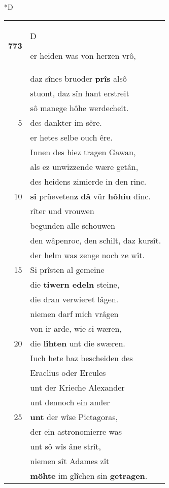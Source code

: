 \documentclass[8pt,a4paper,notitlepage]{article}
\begin{document}
\begin{table}[ht]
\begin{minipage}[t]{0.5\linewidth}
\small
\begin{center}*D
\end{center}
\begin{tabular}{rl}
\textbf{773} & \begin{large}D\end{large}er heiden was von herzen vrô,\\ 
 & daz sînes bruoder \textbf{prîs} alsô\\ 
 & stuont, daz sîn hant erstreit\\ 
 & sô manege hôhe werdecheit.\\ 
5 & des dankter im sêre.\\ 
 & er hetes selbe ouch êre.\\ 
 & Innen des hiez tragen Gawan,\\ 
 & als ez unwizzende wære getân,\\ 
 & des heidens zimierde in den rinc.\\ 
10 & \textbf{si} prüeveten\textbf{z} \textbf{dâ} vür \textbf{hôhiu} dinc.\\ 
 & rîter und vrouwen\\ 
 & begunden alle schouwen\\ 
 & den wâpenroc, den schilt, daz kursît.\\ 
 & der helm was zenge noch ze wît.\\ 
15 & Si prîsten al gemeine\\ 
 & die \textbf{tiwern edeln} steine,\\ 
 & die dran verwieret lâgen.\\ 
 & niemen darf mich vrâgen\\ 
 & von ir arde, wie si wæren,\\ 
20 & die \textbf{lîhten} unt die swæren.\\ 
 & Iuch hete baz bescheiden des\\ 
 & Eraclius oder Ercules\\ 
 & unt der Krieche Alexander\\ 
 & unt dennoch ein ander\\ 
25 & \textbf{unt} der wîse Pictagoras,\\ 
 & der ein astronomierre was\\ 
 & unt sô wîs âne strît,\\ 
 & niemen sît Adames zît\\ 
 & \textbf{möhte} im glîchen sin \textbf{getragen}.\\ 

\end{tabular}
\end{minipage}
\end{table}
\end{document}

